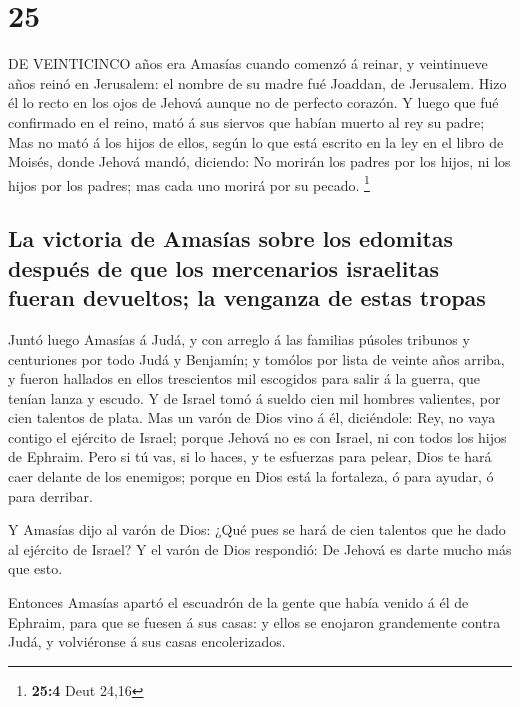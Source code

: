 \hypertarget{section-24}{%
\section{25}\label{section-24}}

 DE VEINTICINCO años era Amasías cuando comenzó á reinar, y
veintinueve años reinó en Jerusalem: el nombre de su madre fué Joaddan,
de Jerusalem.  Hizo él lo recto en los ojos de Jehová aunque
no de perfecto corazón.  Y luego que fué confirmado en el
reino, mató á sus siervos que habían muerto al rey su padre;
 Mas no mató á los hijos de ellos, según lo que está escrito
en la ley en el libro de Moisés, donde Jehová mandó, diciendo: No
morirán los padres por los hijos, ni los hijos por los padres; mas cada
uno morirá por su pecado. \footnote{\textbf{25:4} Deut 24,16}

\hypertarget{la-victoria-de-amasuxedas-sobre-los-edomitas-despuuxe9s-de-que-los-mercenarios-israelitas-fueran-devueltos-la-venganza-de-estas-tropas}{%
\subsection{La victoria de Amasías sobre los edomitas después de que los
mercenarios israelitas fueran devueltos; la venganza de estas
tropas}\label{la-victoria-de-amasuxedas-sobre-los-edomitas-despuuxe9s-de-que-los-mercenarios-israelitas-fueran-devueltos-la-venganza-de-estas-tropas}}

 Juntó luego Amasías á Judá, y con arreglo á las familias
púsoles tribunos y centuriones por todo Judá y Benjamín; y tomólos por
lista de veinte años arriba, y fueron hallados en ellos trescientos mil
escogidos para salir á la guerra, que tenían lanza y escudo.
 Y de Israel tomó á sueldo cien mil hombres valientes, por
cien talentos de plata.  Mas un varón de Dios vino á él,
diciéndole: Rey, no vaya contigo el ejército de Israel; porque Jehová no
es con Israel, ni con todos los hijos de Ephraim.  Pero si
tú vas, si lo haces, y te esfuerzas para pelear, Dios te hará caer
delante de los enemigos; porque en Dios está la fortaleza, ó para
ayudar, ó para derribar.

 Y Amasías dijo al varón de Dios: ¿Qué pues se hará de cien
talentos que he dado al ejército de Israel? Y el varón de Dios
respondió: De Jehová es darte mucho más que esto.

 Entonces Amasías apartó el escuadrón de la gente que había
venido á él de Ephraim, para que se fuesen á sus casas: y ellos se
enojaron grandemente contra Judá, y volviéronse á sus casas
encolerizados.

